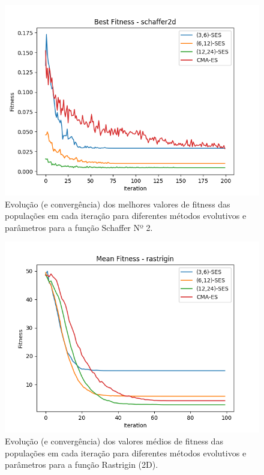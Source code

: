 \documentclass[conference]{IEEEtran}
\begin{document}
\begin{figure}[htbp]
\centering
\centerline{\includegraphics[scale=0.6]{imagens/schaffer2d/best_fitness.png}}
\caption{Evolução (e convergência) dos melhores valores de fitness das populações em cada iteração para diferentes métodos evolutivos e parâmetros para a função Schaffer Nº 2.}
\label{schaffer2d/best_fitness}
\end{figure}

\begin{figure}[htbp]
\centering
\centerline{\includegraphics[scale=0.6]{imagens/rastrigin/mean_fitness.png}}
\caption{Evolução (e convergência) dos valores médios de fitness das populações em cada iteração para diferentes métodos evolutivos e parâmetros para a função Rastrigin (2D).}
\label{rastrigin/mean_fitness}
\end{figure}
\end{document}
